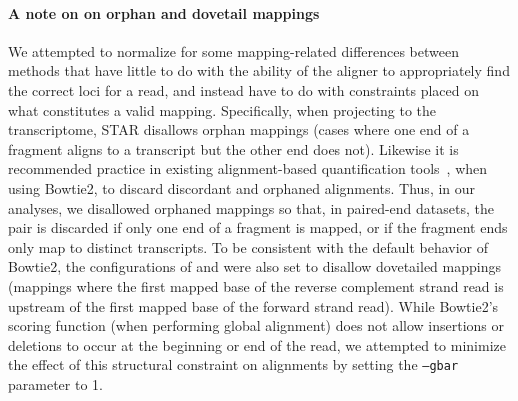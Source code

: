 \paragraph{A note on on orphan and dovetail mappings}
We attempted to normalize for some mapping-related differences between
methods that have little to do with the ability of the aligner to appropriately
find the correct loci for a read, and instead have to do with constraints placed
on what constitutes a valid mapping. Specifically, when projecting to the
transcriptome, STAR disallows orphan mappings (cases where one end of a fragment
aligns to a transcript but the other end does not). Likewise it is recommended
practice in existing alignment-based quantification tools~\citep{rsem,hensman2015fast,glaus2012identifying},
when using Bowtie2, to discard discordant and orphaned alignments. Thus, in our
analyses, we disallowed orphaned mappings so that, in paired-end datasets, the
pair is discarded if only one end of a fragment is mapped, or if the fragment
ends only map to distinct transcripts. To be consistent with the default
behavior of Bowtie2, the configurations of \qm and \hsa were also set to disallow dovetailed mappings (mappings where the
first mapped base of the reverse complement strand read is upstream of the first
mapped base of the forward strand read). While Bowtie2's scoring function (when performing global alignment) 
does not allow insertions or deletions to occur at the beginning or end of the read, we attempted to minimize the 
effect of this structural constraint on alignments by setting the \texttt{--gbar} parameter to 1.


